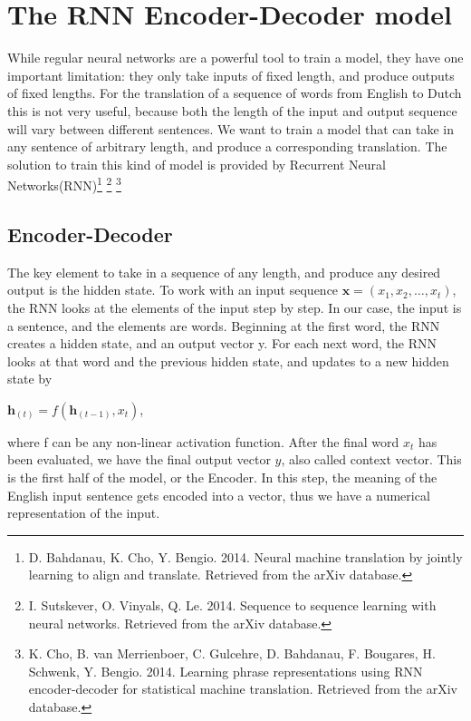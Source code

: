 \documentclass[11pt]{article}
\begin{document}
\section{The RNN Encoder-Decoder model}
While regular neural networks are a powerful tool to train a model, they have one important limitation: they only take inputs of fixed length, and produce outputs of fixed lengths. For the translation of a sequence of words from English to Dutch this is not very useful, because both the length of the input and output sequence will vary between different sentences. We want to train a model that can take in any sentence of arbitrary length, and produce a corresponding translation. The solution to train this kind of model is provided by Recurrent Neural Networks(RNN)\footnote[3]{D. Bahdanau, K. Cho, Y. Bengio. 2014. Neural machine translation by jointly learning to align and translate. Retrieved from the arXiv database.} \footnote[4]{ I. Sutskever, O. Vinyals, Q. Le. 2014. Sequence to sequence learning with neural networks. Retrieved from the arXiv database.} \footnote[5]{K. Cho, B. van Merrienboer, C. Gulcehre, D. Bahdanau, F. Bougares, H. Schwenk, Y. Bengio. 2014. Learning phrase representations using RNN encoder-decoder for statistical machine translation. Retrieved from the arXiv database.}

\subsection{Encoder-Decoder}
The key element to take in a sequence of any length, and produce any desired output is the hidden state. To work with an input sequence $\textbf{x} = (x_1,x_2,…,x_t)$, the RNN looks at the elements of the input step by step. In our case, the input is a sentence, and the elements are words. Beginning at the first word, the RNN creates a hidden state, and an output vector y. For each next word, the RNN looks at that word and the previous hidden state, and updates to a new hidden state by
\begin{center}
    $\textbf{h}_{(t)} = f(\textbf{h}_{(t-1)},x_{t})$,
\end{center} 
where f can be any non-linear activation function. After the final word $x_t$ has been evaluated, we have the final output vector $y$, also called context vector. This is the first half of the model, or the Encoder. In this step, the meaning of the English input sentence gets encoded into a vector, thus we have a numerical representation of the input.
\end{document}
